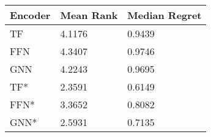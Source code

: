 \begin{tabular}{lll}
\toprule
Encoder & Mean Rank & Median Regret \\
\midrule
TF & 4.1176 & 0.9439 \\
FFN & 4.3407 & 0.9746 \\
GNN & 4.2243 & 0.9695 \\
TF* & 2.3591 & 0.6149 \\
FFN* & 3.3652 & 0.8082 \\
GNN* & 2.5931 & 0.7135 \\
\bottomrule
\end{tabular}

